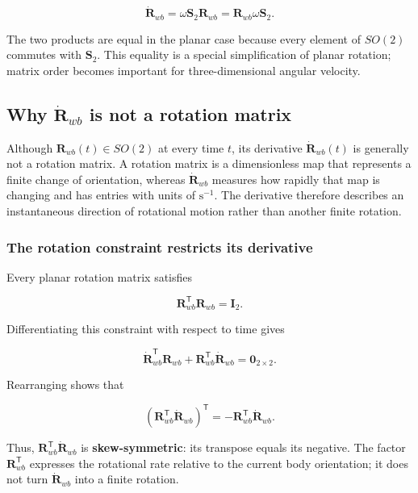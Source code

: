\documentclass[
  australian,
  12pt,
  letterpaper,
  DIV=11,
  numbers=noendperiod,
  twoside]{scrreprt}
\begin{document}
\[
\boxed{
\dot{\mathbf R}_{wb}
=
\omega\mathbf S_2\mathbf R_{wb}
=
\mathbf R_{wb}\omega\mathbf S_2
}.
\]

The two products are equal in the planar case because every element of
\(SO(2)\) commutes with \(\mathbf S_2\). This equality is a special
simplification of planar rotation; matrix order becomes important for
three-dimensional angular velocity.

\subsection{\texorpdfstring{Why \(\dot{\mathbf R}_{wb}\) is not a
rotation
matrix}{Why \textbackslash dot\{\textbackslash mathbf R\}\_\{wb\} is not a rotation matrix}}\label{sec-se2-rotation-derivative-tangent}

Although \(\mathbf R_{wb}(t)\in SO(2)\) at every time \(t\), its
derivative \(\dot{\mathbf R}_{wb}(t)\) is generally not a rotation
matrix. A rotation matrix is a dimensionless map that represents a
finite change of orientation, whereas \(\dot{\mathbf R}_{wb}\) measures
how rapidly that map is changing and has entries with units of
\(\mathrm{s^{-1}}\). The derivative therefore describes an instantaneous
direction of rotational motion rather than another finite rotation.

\subsubsection{The rotation constraint restricts its
derivative}\label{the-rotation-constraint-restricts-its-derivative}

Every planar rotation matrix satisfies

\[
\mathbf R_{wb}^\mathsf T\mathbf R_{wb}
=
\mathbf I_2.
\]

Differentiating this constraint with respect to time gives

\[
\dot{\mathbf R}_{wb}^\mathsf T\mathbf R_{wb}
+
\mathbf R_{wb}^\mathsf T\dot{\mathbf R}_{wb}
=
\mathbf 0_{2\times2}.
\]

Rearranging shows that

\[
\left(
\mathbf R_{wb}^\mathsf T\dot{\mathbf R}_{wb}
\right)^\mathsf T
=
-\mathbf R_{wb}^\mathsf T\dot{\mathbf R}_{wb}.
\]

Thus, \(\mathbf R_{wb}^\mathsf T\dot{\mathbf R}_{wb}\) is
\textbf{skew-symmetric}: its transpose equals its negative. The factor
\(\mathbf R_{wb}^\mathsf T\) expresses the rotational rate relative to
the current body orientation; it does not turn \(\dot{\mathbf R}_{wb}\)
into a finite rotation.
\end{document}
